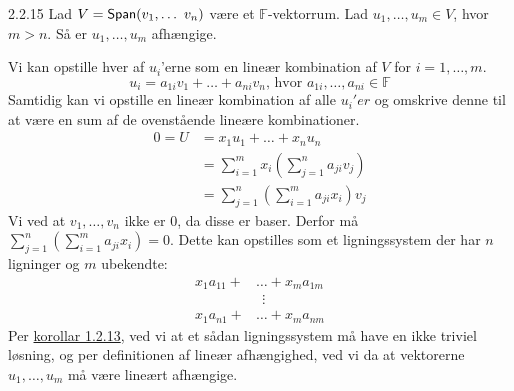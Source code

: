 \begin{saetning}{2.2.15}
	Lad $V = \textsf{Span}(v_1, \dots\ v_n)$ være et $\mathbb{F}$-vektorrum. Lad 
	$u_1, \dots, u_m \in V$, hvor $m > n$. Så er $u_1, \dots, u_m$ afhængige.
\end{saetning}

\begin{bevis}
	Vi kan opstille hver af $u_i$'erne som en lineær kombination af $V$ for 
	$i = 1, \dots, m$.
	\[
		u_i = a_{1i}v_1 + \dots + a_{ni}v_n\text{, hvor }a_{1i}, \dots, a_{ni} 
		\in \mathbb{F}
	\]
	Samtidig kan vi opstille en lineær kombination af alle $u_i'er$ og omskrive
	denne til at være en sum af de ovenstående lineære kombinationer.
	\begin{align*}	
		0 = U &= x_1u_1 + \dots + x_nu_n \\
		&= \sum_{i=1}^mx_i(\sum_{j=1}^na_{ji}v_j) \\
		&= \sum_{j=1}^n(\sum_{i=1}^ma_{ji}x_i)v_j
	\end{align*}
	Vi ved at $v_1, \dots, v_n$ ikke er 0, da disse er baser. Derfor må 
	$\sum_{j=1}^n(\sum_{i=1}^ma_{ji}x_i) = 0$. Dette kan opstilles som et 
	ligningssystem der har $n$ ligninger og $m$ ubekendte:
	\begin{align*}
		x_1a_{11} + &\dots + x_ma_{1m} \\
					&\ \ \vdots \\
		x_1a_{n1} + &\dots + x_ma_{nm}
	\end{align*}
	Per \hyperlink{1.2.13}{korollar 1.2.13}, ved vi at et sådan ligningssystem
	må have en ikke triviel løsning, og per definitionen af lineær afhængighed,
	ved vi da at vektorerne $u_1, \dots, u_m$ må være lineært afhængige.
\end{bevis}
